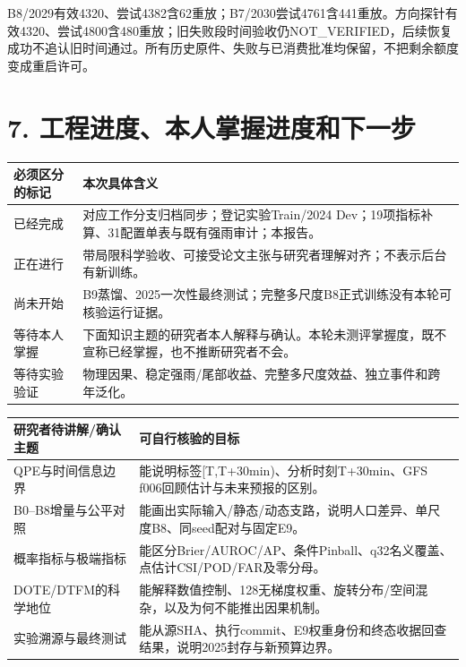 \documentclass[UTF8,a4paper,10pt,fontset=none]{ctexart}
\begin{document}
B8/2029有效4320、尝试4382含62重放；B7/2030尝试4761含441重放。方向探针有效4320、尝试4800含480重放；旧失败段时间验收仍NOT\_VERIFIED，后续恢复成功不追认旧时间通过。所有历史原件、失败与已消费批准均保留，不把剩余额度变成重启许可。

\clearpage
\section*{7. 工程进度、本人掌握进度和下一步}

\begin{center}\small
\begin{tabular}{@{}p{36mm}p{130mm}@{}}
\toprule
必须区分的标记 & 本次具体含义 \\
\midrule
已经完成 & 对应工作分支归档同步；登记实验Train/2024 Dev；19项指标补算、31配置单表与既有强雨审计；本报告。 \\
正在进行 & 带局限科学验收、可接受论文主张与研究者理解对齐；不表示后台有新训练。 \\
尚未开始 & B9蒸馏、2025一次性最终测试；完整多尺度B8正式训练没有本轮可核验运行证据。 \\
等待本人掌握 & 下面知识主题的研究者本人解释与确认。本轮未测评掌握度，既不宣称已经掌握，也不推断研究者不会。 \\
等待实验验证 & 物理因果、稳定强雨/尾部收益、完整多尺度效益、独立事件和跨年泛化。 \\
\bottomrule
\end{tabular}\end{center}
\begin{center}\small
\begin{tabular}{@{}p{50mm}p{116mm}@{}}
\toprule
研究者待讲解/确认主题 & 可自行核验的目标 \\
\midrule
QPE与时间信息边界 & 能说明标签[T,T+30min)、分析时刻T+30min、GFS f006回顾估计与未来预报的区别。 \\
B0--B8增量与公平对照 & 能画出实际输入/静态/动态支路，说明人口差异、单尺度B8、同seed配对与固定E9。 \\
概率指标与极端指标 & 能区分Brier/AUROC/AP、条件Pinball、q32名义覆盖、点估计CSI/POD/FAR及零分母。 \\
DOTE/DTFM的科学地位 & 能解释数值控制、128无梯度权重、旋转分布/空间混杂，以及为何不能推出因果机制。 \\
实验溯源与最终测试 & 能从源SHA、执行commit、E9权重身份和终态收据回查结果，说明2025封存与新预算边界。 \\
\bottomrule
\end{tabular}\end{center}
\end{document}
